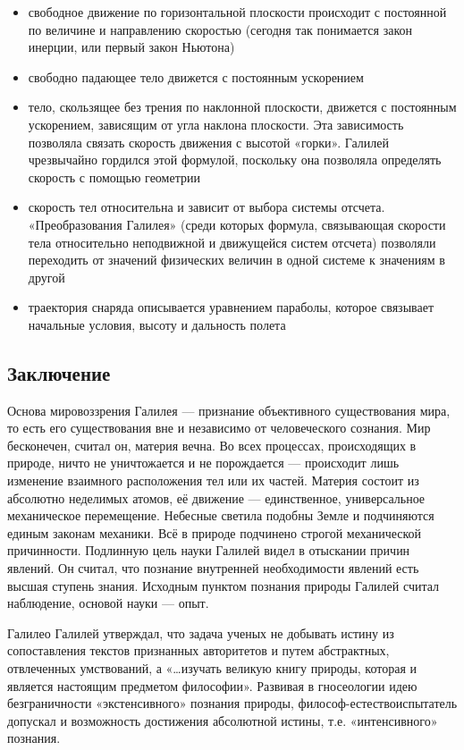 \documentclass[a4paper, 14pt]{extreport}
\begin{document}
\begin{itemize}

\item
  свободное движение по горизонтальной плоскости происходит с постоянной
  по величине и направлению скоростью (сегодня так понимается закон
  инерции, или первый закон Ньютона)
\item
  свободно падающее тело движется с постоянным ускорением
\item
  тело, скользящее без трения по наклонной плоскости, движется с
  постоянным ускорением, зависящим от угла наклона плоскости. Эта
  зависимость позволяла связать скорость движения с высотой «горки».
  Галилей чрезвычайно гордился этой формулой, поскольку она позволяла
  определять скорость с помощью геометрии
\item
  скорость тел относительна и зависит от выбора системы отсчета.
  «Преобразования Галилея» (среди которых формула, связывающая скорости
  тела относительно неподвижной и движущейся систем отсчета) позволяли
  переходить от значений физических величин в одной системе к значениям
  в другой
\item
  траектория снаряда описывается уравнением параболы, которое связывает
  начальные условия, высоту и дальность полета
\end{itemize}

\subsection{Заключение}

Основа мировоззрения Галилея --- признание объективного существования
мира, то есть его существования вне и независимо от человеческого
сознания. Мир бесконечен, считал он, материя вечна. Во всех процессах,
происходящих в природе, ничто не уничтожается и не порождается ---
происходит лишь изменение взаимного расположения тел или их частей.
Материя состоит из абсолютно неделимых атомов, её движение ---
единственное, универсальное механическое перемещение. Небесные светила
подобны Земле и подчиняются единым законам механики. Всё в природе
подчинено строгой механической причинности. Подлинную цель науки Галилей
видел в отыскании причин явлений. Он считал, что познание внутренней
необходимости явлений есть высшая ступень знания. Исходным пунктом
познания природы Галилей считал наблюдение, основой науки --- опыт.

Галилео Галилей утверждал, что задача ученых не добывать истину из
сопоставления текстов признанных авторитетов и путем абстрактных,
отвлеченных умствований, а «\ldots изучать великую книгу природы,
которая и является настоящим предметом философии». Развивая в
гносеологии идею безграничности «экстенсивного» познания природы,
философ-естествоиспытатель допускал и возможность достижения абсолютной
истины, т.е. «интенсивного» познания.
\end{document}
